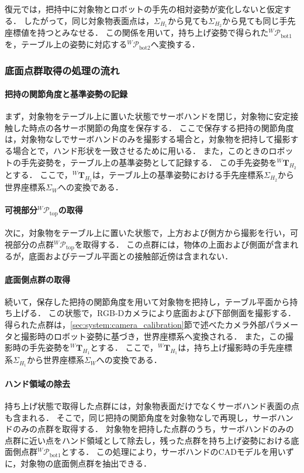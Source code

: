 復元では，把持中に対象物とロボットの手先の相対姿勢が変化しないと仮定する．
したがって，同じ対象物表面点は，$\Sigma_{H_1}$から見ても$\Sigma_{H_2}$から見ても同じ手先座標値を持つとみなせる．
この関係を用いて，持ち上げ姿勢で得られた${}^{W}\mathcal{P}_{\mathrm{bot1}}$を，テーブル上の姿勢に対応する${}^{W}\mathcal{P}_{\mathrm{bot2}}$へ変換する．

\subsubsection{底面点群取得の処理の流れ}
\label{sec:system:bottom_acquisition_flow}

\paragraph{把持の関節角度と基準姿勢の記録}
まず，対象物をテーブル上に置いた状態でサーボハンドを閉じ，対象物に安定接触した時点の各サーボ関節の角度を保存する．
ここで保存する把持の関節角度は，対象物なしでサーボハンドのみを撮影する場合と，対象物を把持して撮影する場合とで，ハンド形状を一致させるために用いる．
また，このときのロボットの手先姿勢を，テーブル上の基準姿勢として記録する．
この手先姿勢を${}^{W}\bm{T}_{H_2}$とする．
ここで，${}^{W}\bm{T}_{H_2}$は，テーブル上の基準姿勢における手先座標系$\Sigma_{H_2}$から世界座標系$\Sigma_W$への変換である．

\paragraph{可視部分${}^{W}\mathcal{P}_{\mathrm{top}}$の取得}
次に，対象物をテーブル上に置いた状態で，上方および側方から撮影を行い，可視部分の点群${}^{W}\mathcal{P}_{\mathrm{top}}$を取得する．
この点群には，物体の上面および側面が含まれるが，底面およびテーブル平面との接触部近傍は含まれない．

\paragraph{底面側点群の取得}
続いて，保存した把持の関節角度を用いて対象物を把持し，テーブル平面から持ち上げる．
この状態で，RGB-Dカメラにより底面および下部側面を撮影する．
得られた点群は，\ref{sec:system:camera_calibration}節で述べたカメラ外部パラメータと撮影時のロボット姿勢に基づき，世界座標系へ変換される．
また，この撮影時の手先姿勢を${}^{W}\bm{T}_{H_1}$とする．
ここで，${}^{W}\bm{T}_{H_1}$は，持ち上げ撮影時の手先座標系$\Sigma_{H_1}$から世界座標系$\Sigma_W$への変換である．

\paragraph{ハンド領域の除去}
持ち上げ状態で取得した点群には，対象物表面だけでなくサーボハンド表面の点も含まれる．
そこで，同じ把持の関節角度を対象物なしで再現し，サーボハンドのみの点群を取得する．
対象物を把持した点群のうち，サーボハンドのみの点群に近い点をハンド領域として除去し，残った点群を持ち上げ姿勢における底面側点群${}^{W}\mathcal{P}_{\mathrm{bot1}}$とする．
この処理により，サーボハンドのCADモデルを用いずに，対象物の底面側点群を抽出できる．

